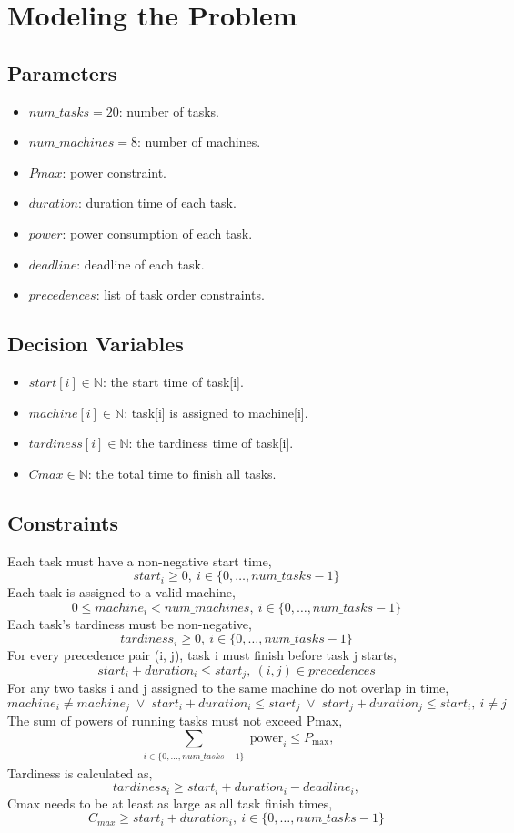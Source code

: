 \documentclass{article}
\begin{document}
\section{Modeling the Problem}

\subsection{Parameters}
\begin{itemize}
  \item $num\_tasks = 20$: number of tasks.
  \item $num\_machines = 8$: number of machines.
  \item $Pmax$: power constraint.
  \item $duration$: duration time of each task.
  \item $power$: power consumption of each task.
  \item $deadline$: deadline of each task.
  \item $precedences$: list of task order constraints.
\end{itemize}

\subsection{Decision Variables}
\begin{itemize}
  \item $start[i] \in \mathbb{N}$: the start time of task[i].
  \item $machine[i] \in \mathbb{N}$: task[i] is assigned to machine[i].
  \item $tardiness[i] \in \mathbb{N}$: the tardiness time of task[i].
  \item $Cmax \in \mathbb{N}$: the total time to finish all tasks.
\end{itemize}

\subsection{Constraints}
Each task must have a non-negative start time,
\[
start_i \ge 0, \ i \in \{0, \dots, num\_tasks-1\}
\]
Each task is assigned to a valid machine,
\[
0 \le machine_i < num\_machines, \ i \in \{0, \dots, num\_tasks-1\}
\]
Each task’s tardiness must be non-negative,
\[
tardiness_i \ge 0, \  i \in \{0, \dots, num\_tasks-1\}
\]
For every precedence pair (i, j), task i must finish before task j starts,
\[
start_i + duration_i \le start_j, \  (i,j) \in precedences
\]
For any two tasks i and j assigned to the same machine do not overlap in time,
\[
machine_i \neq machine_j \;\lor\; start_i + duration_i \le start_j \;\lor\; start_j + duration_j \le start_i, \ i\neq j 
\]
The sum of powers of running tasks must not exceed Pmax,
\[
\sum_{\substack{ i \in \{0, \dots, num\_tasks-1\}}} \text{power}_i
\le P_{\max},
\]
Tardiness is calculated as,
\[
 tardiness_i \ge start_i + duration_i - deadline_i, 
\]
Cmax needs to be at least as large as all task finish times,
\[
C_{max} \ge start_i + duration_i,\ i \in \{0, \dots, num\_tasks-1\}
\]
\end{document}
